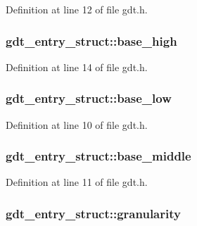 Definition at line 12 of file gdt.h.

\hypertarget{structgdt__entry__struct_ae8d854fbc8e2c8544bc80d965a2aecd3}{
\subsubsection[{base\_\-high}]{ {\bf gdt\_\-entry\_\-struct::base\_\-high}}}
\label{structgdt__entry__struct_ae8d854fbc8e2c8544bc80d965a2aecd3}


Definition at line 14 of file gdt.h.

\hypertarget{structgdt__entry__struct_a7c96ac08a038dba0f1263dd0bff79e30}{
\subsubsection[{base\_\-low}]{ {\bf gdt\_\-entry\_\-struct::base\_\-low}}}
\label{structgdt__entry__struct_a7c96ac08a038dba0f1263dd0bff79e30}


Definition at line 10 of file gdt.h.

\hypertarget{structgdt__entry__struct_a22556a73f72b32b1088f4bfdfdc4fac5}{
\subsubsection[{base\_\-middle}]{ {\bf gdt\_\-entry\_\-struct::base\_\-middle}}}
\label{structgdt__entry__struct_a22556a73f72b32b1088f4bfdfdc4fac5}


Definition at line 11 of file gdt.h.

\hypertarget{structgdt__entry__struct_ab1a59375bffe9bd70dcda6b97ebc4e62}{
\subsubsection[{granularity}]{ {\bf gdt\_\-entry\_\-struct::granularity}}}
\label{structgdt__entry__struct_ab1a59375bffe9bd70dcda6b97ebc4e62}


